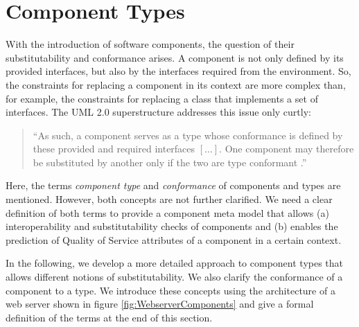 \section{Component Types}
\label{sec:ComponentTypes}
With the introduction of software components, the question of their
substitutability and conformance arises. A component is not only defined by its
provided interfaces, but also by the interfaces required from the environment.
So, the constraints for replacing a component in its context are more complex
than, for example, the constraints for replacing a class that implements a set
of interfaces. The UML 2.0 superstructure addresses this issue only curtly:

\begin{quote}
``As such, a component serves as a type whose conformance is defined by these
provided and required interfaces $[\ldots]$. One component may therefore be
substituted by another only if the two are type conformant
\cite[p.142]{OMGUML2005a}.''
\end{quote}

Here, the terms \emph{component type} and \emph{conformance} of components and
types are mentioned. However, both concepts are not further clarified. We need a
clear definition of both terms to provide a component meta model that allows (a)
 interoperability and substitutability checks of components and (b) enables the
prediction of Quality of Service attributes of a component in a certain context.

In the following, we develop a more detailed approach to component types that
allows different notions of substitutability. We also clarify the conformance of
a component to a type. We introduce these concepts using the architecture of a
web server shown in figure \ref{fig:WebserverComponents} and give a formal
definition of the terms at the end of this section.

